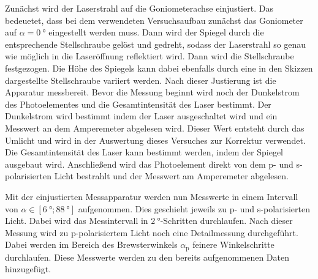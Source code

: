 Zunächst wird der Laserstrahl auf die Goniometerachse einjustiert. Das bedeuetet, dass bei dem verwendeten Versuchsaufbau zunächst das Goniometer auf $\alpha = \qty{0}{\degree}$
eingestellt werden muss. Dann wird der Spiegel durch die entsprechende Stellschraube gelöst und gedreht, sodass der Laserstrahl so genau wie möglich in die Laseröffnung 
reflektiert wird. Dann wird die Stellschraube festgezogen. Die Höhe des Spiegels kann dabei ebenfalls durch eine in den Skizzen dargestellte Stellschraube variiert werden.
Nach dieser Justierung ist die Apparatur messbereit. 
Bevor die Messung beginnt wird noch der Dunkelstrom des Photoelementes und  die Gesamtintensität des Laser bestimmt. Der Dunkelstrom wird bestimmt indem der Laser ausgeschaltet 
wird und ein Messwert an dem Amperemeter abgelesen wird. Dieser Wert entsteht durch das Umlicht und wird in der Auswertung dieses Versuches zur Korrektur verwendet. 
Die Gesamtintensität des Laser kann bestimmt werden, indem der Spiegel ausgebaut wird. Anschließend wird das Photoelement direkt von dem p- und s-polarisierten Licht bestrahlt und 
der Messwert am Amperemeter abgelesen.

Mit der einjustierten Messapparatur werden nun Messwerte in einem Intervall von $\alpha \in \left[\qty{6}{\degree} ; \qty{88}{\degree}\right]$ aufgenommen. Dies geschieht 
jeweils zu p- und s-polarisierten Licht. Dabei wird das Messintervall in $\qty{2}{\degree}$-Schritten durchlaufen. Nach dieser Messung wird zu p-polarisiertem Licht noch eine
Detailmessung durchgeführt. Dabei werden im Bereich des Brewsterwinkels $\alpha_{\text{p}}$ feinere Winkelschritte durchlaufen. Diese Messwerte werden zu den bereits 
aufgenommenen Daten hinzugefügt.